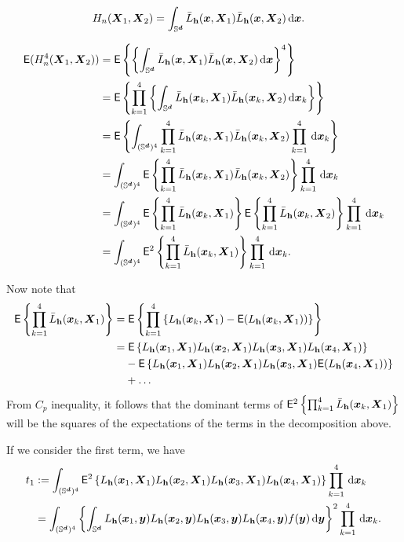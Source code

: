 \documentclass{article}
\begin{document}
\begin{align*}
    H_n(\bX_1, \bX_2) &= \int_{\Sr} \bar{L}_{\bh} (\bx,\bX_1) \bar{L}_{\bh} (\bx,\bX_2) \,\rd \bx.
\end{align*}

\begin{align*}
    \mathsf{E} ( H_n^4(\bX_1, \bX_2)) &= \mathsf{E}\lrb{ \lrb{\int_{\Sr} \bar{L}_{\bh} (\bx,\bX_1) \bar{L}_{\bh} (\bx,\bX_2) \,\rd \bx}^4 } \\
    &= \mathsf{E}\lrb{ \prod_{k=1}^{4} \lrb{\int_{\Sr} \bar{L}_{\bh} (\bx_k,\bX_1) \bar{L}_{\bh} (\bx_k,\bX_2) \,\rd \bx_k} } \\ 
    &= \mathsf{E} \lrb{\int_{(\Sr)^4} \prod_{k=1}^{4}\bar{L}_{\bh} (\bx_k,\bX_1) \bar{L}_{\bh} (\bx_k,\bX_2) \prod_{k=1}^{4} \,\rd \bx_k}  \\
    &= \int_{(\Sr)^4} \mathsf{E} \lrb{ \prod_{k=1}^{4}\bar{L}_{\bh} (\bx_k,\bX_1) \bar{L}_{\bh} (\bx_k,\bX_2) }\prod_{k=1}^{4} \,\rd \bx_k  \\
    &= \int_{(\Sr)^4} \mathsf{E} \lrb{ \prod_{k=1}^{4}\bar{L}_{\bh} (\bx_k,\bX_1)} \mathsf{E} \lrb{ \prod_{k=1}^{4} \bar{L}_{\bh} (\bx_k,\bX_2) }\prod_{k=1}^{4} \,\rd \bx_k  \\
    &= \int_{(\Sr)^4} \mathsf{E}^2 \lrb{ \prod_{k=1}^{4}\bar{L}_{\bh} (\bx_k,\bX_1)} \prod_{k=1}^{4} \,\rd \bx_k.
\end{align*}

Now note that
\begin{align*}
    \mathsf{E} \lrb{ \prod_{k=1}^{4}\bar{L}_{\bh} (\bx_k,\bX_1)} =&\; \mathsf{E} \lrb{ \prod_{k=1}^{4} \lrb{ L_{\bh} (\bx_k,\bX_1) - \mathsf{E} (L_{\bh} (\bx_k,\bX_1)) } } \\
    =&\; \mathsf{E} \lrb{ L_{\bh} (\bx_1,\bX_1) L_{\bh} (\bx_2,\bX_1) L_{\bh} (\bx_3,\bX_1) L_{\bh} (\bx_4,\bX_1)}  \\
    &- \mathsf{E} \lrb{ L_{\bh} (\bx_1,\bX_1) L_{\bh} (\bx_2,\bX_1) L_{\bh} (\bx_3,\bX_1) \mathsf{E} (L_{\bh} (\bx_4,\bX_1))} \\
    &+ \dots
\end{align*}
From $C_p$ inequality, it follows that the dominant terms of $\mathsf{E}^2 \lrb{ \prod_{k=1}^{4}\bar{L}_{\bh} (\bx_k,\bX_1)}$ will be the squares of the expectations of the terms in the decomposition above.

If we consider the first term, we have
\begin{align*}
    t_1 &\defin \int_{(\Sr)^4} \mathsf{E}^2 \lrb{ L_{\bh} (\bx_1,\bX_1) L_{\bh} (\bx_2,\bX_1) L_{\bh} (\bx_3,\bX_1) L_{\bh} (\bx_4,\bX_1)} \prod_{k=1}^{4} \,\rd \bx_k \\
    &= \int_{(\Sr)^4} \lrb{ \int_{\Sr}L_{\bh} (\bx_1,\by) L_{\bh} (\bx_2,\by) L_{\bh} (\bx_3,\by) L_{\bh} (\bx_4,\by) f(\by) \,\rd \by }^2 \prod_{k=1}^{4} \,\rd \bx_k.
\end{align*}
\end{document}
